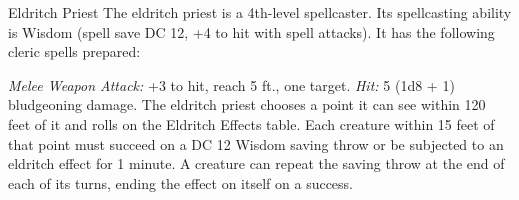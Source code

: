 \documentclass[10pt,a4paper,twoside,twocolumn,openany,bg=print,nodeprecatedcode]{dndbook}
\begin{document}
\begin{DndMonster}[float*=t]{Eldritch Priest}
\DndMonsterBasics[
armor-class = {13 (chain shirt)},
hit-points = {\DndDice{4d8 + 4}},
speed = {30 ft.}
]
\DndMonsterAbilityScores[
 str = 12,
 dex = 11,
 con = 13,
 int = 10,
 wis = 15,
 cha = 10
]
\DndMonsterDetails[
skills = {Perception +4, Religion +2},
languages = {any two languages},
challenge = 2,
]
The eldritch priest is a 4th-level spellcaster. Its spellcasting ability is Wisdom (spell save DC 12, +4 to hit with spell attacks). It has the following cleric spells prepared:
\begin{DndMonsterSpells}
\end{DndMonsterSpells}
\par
{}
\textsl{Melee Weapon Attack:} +3 to hit, reach 5 ft., one target. \textsl{Hit:} 5 (1d8 + 1) bludgeoning damage.
The eldritch priest chooses a point it can see within 120 feet of it and rolls on the Eldritch Effects table. Each creature within 15 feet of that point must succeed on a DC 12 Wisdom saving throw or be subjected to an eldritch effect for 1 minute. A creature can repeat the saving throw at the end of each of its turns, ending the effect on itself on a success.
\end{DndMonster}
\end{document}
